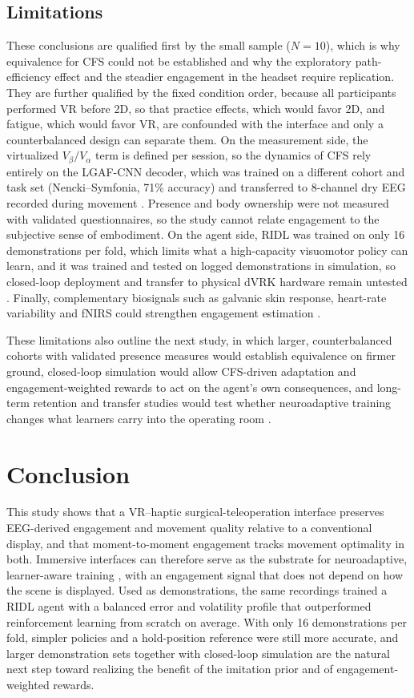 \documentclass[utf8]{frontiers_suppmat}
\begin{document}
\subsection{Limitations}
These conclusions are qualified first by the small sample ($N=10$), which is why equivalence for CFS could not be established and why the exploratory path-efficiency effect and the steadier engagement in the headset require replication. They are further qualified by the fixed condition order, because all participants performed VR before 2D, so that practice effects, which would favor 2D, and fatigue, which would favor VR, are confounded with the interface and only a counterbalanced design can separate them. On the measurement side, the virtualized $V_\beta/V_\alpha$ term is defined per session, so the dynamics of CFS rely entirely on the LGAF-CNN decoder, which was trained on a different cohort and task set (Nencki--Symfonia, 71\% accuracy) and transferred to 8-channel dry EEG recorded during movement \cite{Duvinage2013Performance}. Presence and body ownership were not measured with validated questionnaires, so the study cannot relate engagement to the subjective sense of embodiment. On the agent side, RIDL was trained on only 16 demonstrations per fold, which limits what a high-capacity visuomotor policy can learn, and it was trained and tested on logged demonstrations in simulation, so closed-loop deployment and transfer to physical dVRK hardware remain untested \cite{d2021accelerating,Matas2018}. Finally, complementary biosignals such as galvanic skin response, heart-rate variability and fNIRS could strengthen engagement estimation \cite{Ban2022KernelFlow,Li2024Reduced,Melcer2018CTRLLabs}.

These limitations also outline the next study, in which larger, counterbalanced cohorts with validated presence measures would establish equivalence on firmer ground, closed-loop simulation would allow CFS-driven adaptation and engagement-weighted rewards to act on the agent's own consequences, and long-term retention and transfer studies would test whether neuroadaptive training changes what learners carry into the operating room \cite{Gawecki2020}.

\section{Conclusion}
This study shows that a VR--haptic surgical-teleoperation interface preserves EEG-derived engagement and movement quality relative to a conventional display, and that moment-to-moment engagement tracks movement optimality in both. Immersive interfaces can therefore serve as the substrate for neuroadaptive, learner-aware training \cite{9262701,Feussner2017}, with an engagement signal that does not depend on how the scene is displayed. Used as demonstrations, the same recordings trained a RIDL agent with a balanced error and volatility profile that outperformed reinforcement learning from scratch on average. With only 16 demonstrations per fold, simpler policies and a hold-position reference were still more accurate, and larger demonstration sets together with closed-loop simulation are the natural next step toward realizing the benefit of the imitation prior and of engagement-weighted rewards.
\end{document}

